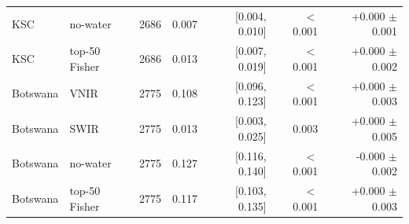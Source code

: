 \begin{tabular}{llrrrrr}
KSC & no-water & 2686 & 0.007 & [0.004, 0.010] & $<$ 0.001 & +0.000 $\pm$ 0.001 \\
KSC & top-50 Fisher & 2686 & 0.013 & [0.007, 0.019] & $<$ 0.001 & +0.000 $\pm$ 0.002 \\
Botswana & VNIR & 2775 & 0.108 & [0.096, 0.123] & $<$ 0.001 & +0.000 $\pm$ 0.003 \\
Botswana & SWIR & 2775 & 0.013 & [0.003, 0.025] & 0.003 & +0.000 $\pm$ 0.005 \\
Botswana & no-water & 2775 & 0.127 & [0.116, 0.140] & $<$ 0.001 & -0.000 $\pm$ 0.002 \\
Botswana & top-50 Fisher & 2775 & 0.117 & [0.103, 0.135] & $<$ 0.001 & +0.000 $\pm$ 0.003 \\
\bottomrule
\end{tabular}